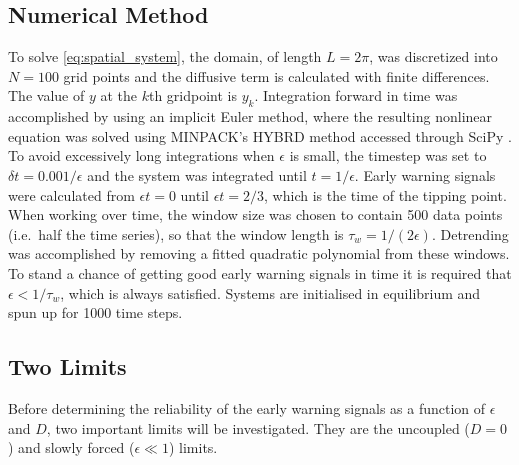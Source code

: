 \subsection{Numerical Method}
To solve \cref{eq:spatial_system}, the domain, of length $L = 2\pi$, was discretized into $N = 100$ grid
points and 
the diffusive term is calculated with finite differences. The value of $y$ at the $k$th gridpoint is $y_k$. Integration forward in time was accomplished by 
using an implicit Euler method, where the resulting nonlinear equation was solved using 
MINPACK's HYBRD method accessed through SciPy \parencite{Virtanen2020}. To avoid excessively long integrations when $\epsilon$ is small,
the timestep was set to $\delta t = 0.001/\epsilon$ and the system was integrated until $t=1/\epsilon$. Early warning signals were calculated
from $\epsilon t=0$ until $\epsilon t=2/3$, which is the 
time of the tipping point. When working over time, the window size was chosen to 
contain 500 data points (i.e.\ half the time series),
so that the window length is $\tau_w = 1/(2\epsilon)$. Detrending was accomplished by removing a fitted quadratic polynomial from these windows.
To stand a chance of getting good early warning
signals in time it is required that $\epsilon < 1/\tau_w$, which is always satisfied.
Systems are initialised in equilibrium and spun up for 1000 time steps.

\subsection{Two Limits}
Before determining the reliability of the early warning signals as a function of $\epsilon$ and $D$, two important limits will be investigated. They are the uncoupled ($D = 0$)
and slowly forced ($\epsilon \ll 1$) limits.

